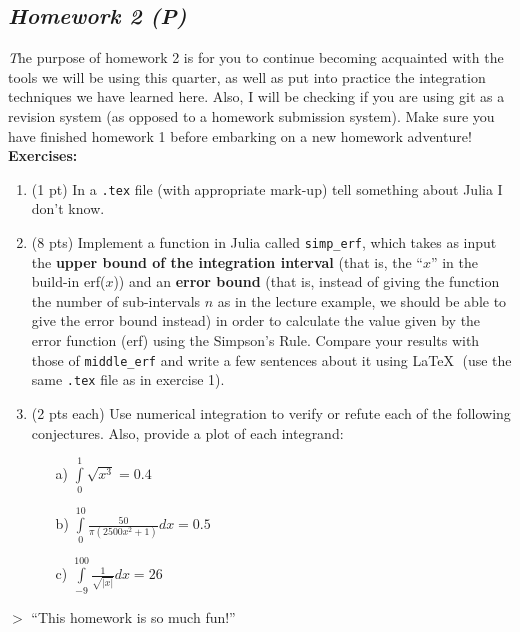 \documentclass[11pt,a4paper,oneside]{report}
\begin{document}
{\center\color{magenta}
\subsection*{{\it\huge Homework 2 (P)}}}

{\it\huge T}he purpose of homework 2 is for you to continue becoming acquainted with the tools we will be using this quarter, as well as put into practice the integration techniques we have learned here. Also, I will be checking if you are using git as a revision system (as opposed to a homework submission system). Make sure you have finished homework 1 before embarking on a new homework adventure!\\

{\bf Exercises: }
\begin{enumerate}
\item (1 pt) In a \verb+.tex+ file (with appropriate mark-up) tell something about Julia I don't know. 
\item (8 pts) Implement a function in Julia called \verb+simp_erf+, which takes as input the {\bf upper bound of the integration interval} (that is, the ``$x$'' in the build-in erf($x$)) and an {\bf error bound} (that is, instead of giving the function the number of sub-intervals $n$ as in the lecture example, we should be able to give the error bound instead) in order to calculate the value given by the error function (erf) using the Simpson's Rule. Compare your results with those of \verb+middle_erf+ and write a few sentences about it using \LaTeX $\;$ (use the same \verb+.tex+ file as in exercise 1).

\item (2 pts each) Use numerical integration to verify or refute each of the following conjectures. Also, provide a plot of each integrand:
\begin{enumerate}
\item[a) ] $\displaystyle\int\limits_0^1 \sqrt{x^3} = 0.4$
\item[b) ] $\displaystyle\int\limits_0^{10} \frac{50}{\pi(2500x^2+1)}dx = 0.5$
\item[c) ] $\displaystyle\int\limits_{-9}^{100} \frac{1}{\sqrt{|x|}}dx = 26$
\end{enumerate}
\end{enumerate}
\begin{center}
\Lisa $>$ ``This homework is so much fun!''
\end{center} 
\newpage
\end{document}
